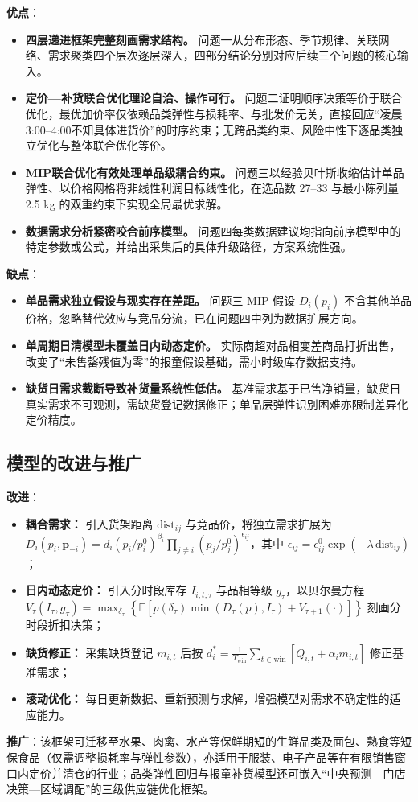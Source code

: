 \textbf{优点}：
\begin{itemize}
    \item \textbf{四层递进框架完整刻画需求结构。} 问题一从分布形态、季节规律、关联网络、需求聚类四个层次逐层深入，四部分结论分别对应后续三个问题的核心输入。
    \item \textbf{定价—补货联合优化理论自洽、操作可行。} 问题二证明顺序决策等价于联合优化，最优加价率仅依赖品类弹性与损耗率、与批发价无关，直接回应“凌晨3:00--4:00不知具体进货价”的时序约束；无跨品类约束、风险中性下逐品类独立优化与整体联合优化等价。
    \item \textbf{MIP联合优化有效处理单品级耦合约束。} 问题三以经验贝叶斯收缩估计单品弹性、以价格网格将非线性利润目标线性化，在选品数 27--33 与最小陈列量 2.5 kg 的双重约束下实现全局最优求解。
    \item \textbf{数据需求分析紧密咬合前序模型。} 问题四每类数据建议均指向前序模型中的特定参数或公式，并给出采集后的具体升级路径，方案系统性强。
\end{itemize}

\textbf{缺点}：
\begin{itemize}
    \item \textbf{单品需求独立假设与现实存在差距。} 问题三 MIP 假设 $D_i(p_i)$ 不含其他单品价格，忽略替代效应与竞品分流，已在问题四中列为数据扩展方向。
    \item \textbf{单周期日清模型未覆盖日内动态定价。} 实际商超对品相变差商品打折出售，改变了“未售罄残值为零”的报童假设基础，需小时级库存数据支持。
    \item \textbf{缺货日需求截断导致补货量系统性低估。} 基准需求基于已售净销量，缺货日真实需求不可观测，需缺货登记数据修正；单品层弹性识别困难亦限制差异化定价精度。
\end{itemize}

\subsection{模型的改进与推广}

\textbf{改进}：
\begin{itemize}
    \item \textbf{耦合需求：} 引入货架距离 $\mathrm{dist}_{ij}$ 与竞品价，将独立需求扩展为 $D_i(p_i,\mathbf{p}_{-i})=d_i(p_i/p_i^0)^{\beta_i}\prod_{j\ne i}(p_j/p_j^0)^{\epsilon_{ij}}$，其中 $\epsilon_{ij}=\epsilon_{ij}^0\exp(-\lambda\,\mathrm{dist}_{ij})$；
    \item \textbf{日内动态定价：} 引入分时段库存 $I_{i,t,\tau}$ 与品相等级 $g_\tau$，以贝尔曼方程 $V_\tau(I_\tau,g_\tau)=\max_{\delta_\tau}\left\{\mathbb{E}\left[p(\delta_\tau)\min(D_\tau(p),I_\tau)+V_{\tau+1}(\cdot)\right]\right\}$ 刻画分时段折扣决策；
    \item \textbf{缺货修正：} 采集缺货登记 $m_{i,t}$ 后按 $d_i^*=\frac{1}{T_{\mathrm{win}}}\sum_{t\in\mathrm{win}}\left[Q_{i,t}+\alpha_i m_{i,t}\right]$ 修正基准需求；
    \item \textbf{滚动优化：} 每日更新数据、重新预测与求解，增强模型对需求不确定性的适应能力。
\end{itemize}

\textbf{推广}：该框架可迁移至水果、肉禽、水产等保鲜期短的生鲜品类及面包、熟食等短保食品（仅需调整损耗率与弹性参数），亦适用于服装、电子产品等在有限销售窗口内定价并清仓的行业；品类弹性回归与报童补货模型还可嵌入“中央预测—门店决策—区域调配”的三级供应链优化框架。
